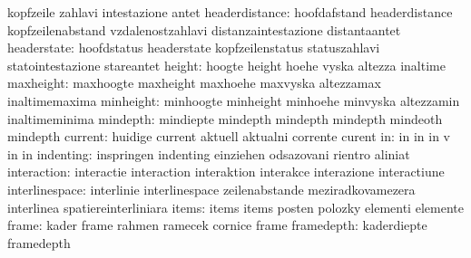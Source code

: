                            kopfzeile                 zahlavi
                           intestazione              antet
           headerdistance: hoofdafstand              headerdistance
                           kopfzeilenabstand         vzdalenostzahlavi
                           distanzaintestazione      distantaantet
              headerstate: hoofdstatus               headerstate
                           kopfzeilenstatus          statuszahlavi
                           statointestazione         stareantet
                   height: hoogte                    height
                           hoehe                     vyska
                           altezza                   inaltime
                maxheight: maxhoogte                 maxheight
                           maxhoehe                  maxvyska
                           altezzamax                inaltimemaxima
                minheight: minhoogte                 minheight
                           minhoehe                  minvyska
                           altezzamin                inaltimeminima
                 mindepth: mindiepte                 mindepth
                           mindepth                  mindepth
                           mindeoth                  mindepth %
                  current: huidige                   current
                           aktuell                   aktualni
                           corrente                  curent
                       in: in                        in
                           in                        v
                           in                        in
                indenting: inspringen                indenting
                           einziehen                 odsazovani
                           rientro                   aliniat
              interaction: interactie                interaction
                           interaktion               interakce
                           interazione               interactiune
           interlinespace: interlinie                interlinespace
                           zeilenabstande            meziradkovamezera
                           interlinea                spatiereinterliniara
                    items: items                     items
                           posten                    polozky
                           elementi                  elemente
                    frame: kader                     frame
                           rahmen                    ramecek
                           cornice                   frame
               framedepth: kaderdiepte               framedepth
